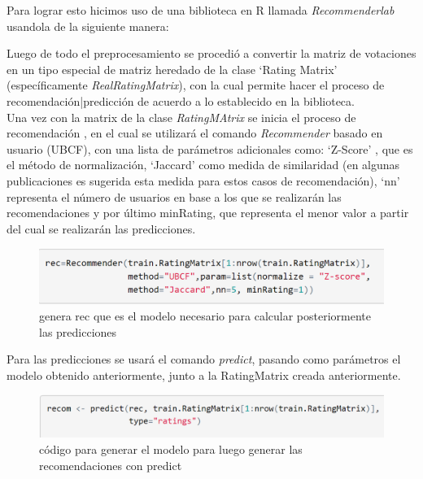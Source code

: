 \documentclass{sciposter}
\begin{document}
\begin{multicols}{3}
Para lograr esto hicimos uso de una biblioteca en R llamada \emph{Recommenderlab} usandola de la siguiente manera: 

Luego de todo el preprocesamiento se procedi\'o a convertir la matriz de votaciones en un tipo especial de matriz heredado de la clase ‘Rating Matrix’ (espec\'ificamente \emph{RealRatingMatrix}), con la cual permite hacer el proceso de recomendaci\'on|predicci\'on de acuerdo a lo establecido en la biblioteca.\\

Una vez con la matrix de la clase \emph{RatingMAtrix} se inicia el proceso de recomendaci\'on , en el cual se utilizar\'a el comando \emph{Recommender} basado en usuario (UBCF), con una lista de par\'ametros adicionales como: ‘Z-Score’ , que es el m\'etodo de normalizaci\'on, ‘Jaccard’ como medida de similaridad  (en algunas publicaciones es sugerida esta medida para estos casos de recomendaci\'on),  ‘nn’ representa el n\'umero de usuarios en base a los que se realizar\'an las recomendaciones  y por \'ultimo minRating, que representa el menor valor a partir del cual se realizar\'an las predicciones.


\begin{figure}
\begin{center}

 	\includegraphics[scale=0.65]{rec6}
\end{center}
\caption{ genera rec que es el modelo necesario para calcular posteriormente las predicciones }\label{fig:rec5} %
\end{figure}



Para las predicciones se usar\'a el comando \emph{predict}, pasando como par\'ametros el modelo obtenido anteriormente, junto a la RatingMatrix creada anteriormente.

\begin{figure}
\begin{center}

 	\includegraphics[scale=0.65]{recom4}
\end{center}
\caption{ c\'odigo para generar el modelo para luego generar las recomendaciones con predict }\label{fig:predict}
\end{figure}



\end{multicols}
\end{document}
